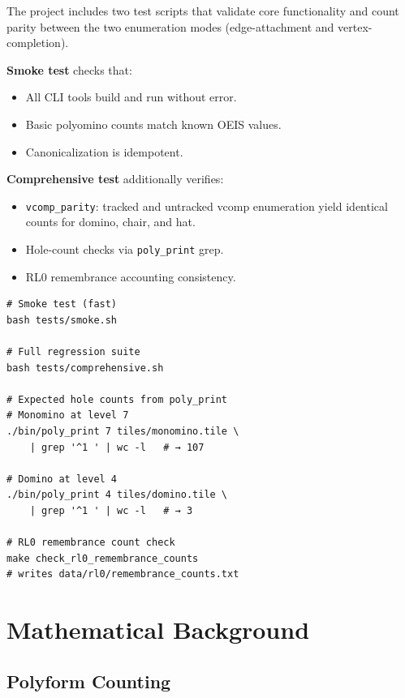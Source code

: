 \documentclass[10pt,a4paper]{article}
\let\polysection\section
\renewcommand\section{\needspace{0.16\textheight}\polysection}
\let\polysubsection\subsection
\renewcommand\subsection{\needspace{0.12\textheight}\polysubsection}
\newcommand{\code}[1]{\texttt{\small #1}}
\newcommand{\file}[1]{\texttt{\footnotesize #1}}
\begin{document}
\begin{tcolorbox}[dualbox, title=Test Suite — \file{tests/}]
  The project includes two test scripts that validate core
  functionality and count parity between the two enumeration modes
  (edge-attachment and vertex-completion).

  \textbf{Smoke test} checks that:
  \begin{itemize}
    \item All CLI tools build and run without error.
    \item Basic polyomino counts match known OEIS values.
    \item Canonicalization is idempotent.
  \end{itemize}

  \textbf{Comprehensive test} additionally verifies:
  \begin{itemize}
    \item \code{vcomp\_parity}: tracked and untracked vcomp
      enumeration yield identical counts for domino, chair, and hat.
    \item Hole-count checks via \code{poly\_print} grep.
    \item RL0 remembrance accounting consistency.
  \end{itemize}
\tcblower
\begin{verbatim}
# Smoke test (fast)
bash tests/smoke.sh

# Full regression suite
bash tests/comprehensive.sh

# Expected hole counts from poly_print
# Monomino at level 7
./bin/poly_print 7 tiles/monomino.tile \
    | grep '^1 ' | wc -l   # → 107

# Domino at level 4
./bin/poly_print 4 tiles/domino.tile \
    | grep '^1 ' | wc -l   # → 3

# RL0 remembrance count check
make check_rl0_remembrance_counts
# writes data/rl0/remembrance_counts.txt
\end{verbatim}
\end{tcolorbox}

\section{Mathematical Background}

\subsection{Polyform Counting}
\end{document}
